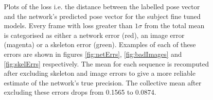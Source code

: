 \documentclass[11pt]{article} %
\begin{document}
\begin{figure}
\ContinuedFloat
\centering
%
\qquad
{}%
\caption{Plots of the loss i.e. the distance between the labelled pose vector and the network's predicted pose vector for the subject fine tuned models. Every frame with loss greater than $1\sigma$ from the total mean is categorised as either a network error (red), an image error (magenta) or a skeleton error (green). Examples of each of these errors are shown in figures \ref{fig:netErrs}, \ref{fig:badImages} and \ref{fig:skelErrs} respectively. The mean for each sequence is recomputed after excluding skeleton and image errors to give a more reliable estimate of the network's true precision. The collective mean after excluding these errors drops from 0.1565 to 0.0874. }
\label{fig:classedErr}
\end{figure}
\end{document}
